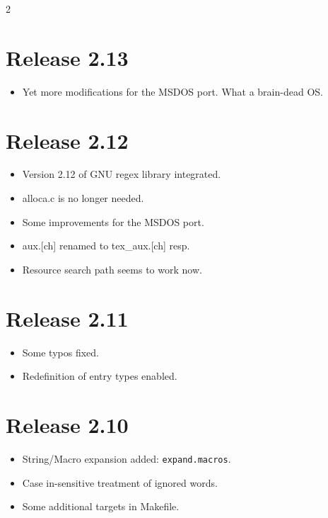 \documentclass[11pt,a4paper]{scrartcl}
\newcommand\rsc[1]{\texttt{#1}}
\newcommand\File[1]{\textsf{#1}}
\newenvironment{Releases}{\begin{multicols}2\RaggedRight}{\end{multicols}}
\newenvironment{Release}[2]{%
  \def\tmp{#2}%
  \section*{Release #1 \ifx\tmp\empty\else{\normalsize[#2]}\fi}
  \begin{itemize}
}{\end{itemize}}
\newenvironment{Fix}[1]{\item }{}
\newenvironment{New}[1]{\item }{}
\newenvironment{Update}[1]{\item }{}
\begin{document}
\begin{Releases}
 \begin{Release}{2.13}{}
  \begin{New}{gene}
    Yet more modifications for the MSDOS port. What a brain-dead OS.
  \end{New}
 \end{Release}

 \begin{Release}{2.12}{}
  \begin{Update}{gene}
    Version 2.12 of GNU regex library integrated.
  \end{Update}
  \begin{Update}{gene}
    \File{alloca.c} is no longer needed.
  \end{Update}
  \begin{Fix}{gene}
    Some improvements for the MSDOS port.
  \end{Fix}
  \begin{Fix}{gene}
    \File{aux.[ch]} renamed to \File{tex\_aux.[ch]} resp.
  \end{Fix}
  \begin{Fix}{gene}
    Resource search path seems to work now.
  \end{Fix}
 \end{Release}

 \begin{Release}{2.11}{}
  \begin{Fix}{gene}
    Some typos fixed.
  \end{Fix}
  \begin{Update}{gene}
	Redefinition of entry types enabled.
  \end{Update}
 \end{Release}

 \begin{Release}{2.10}{}
  \begin{New}{gene}
    String/Macro expansion added: \rsc{expand.macros}.
  \end{New}
  \begin{Update}{gene}
    Case in-sensitive treatment of ignored words.
  \end{Update}
  \begin{Update}{gene}
    Some additional targets in \File{Makefile}.
  \end{Update}
 \end{Release}


\end{Releases}
\end{document}
